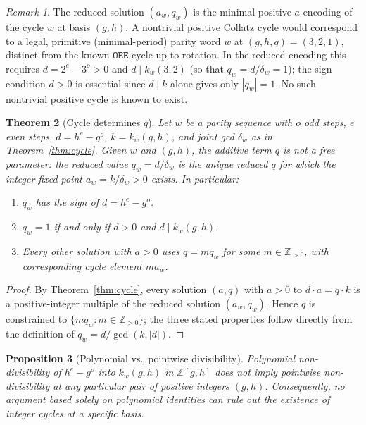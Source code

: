 \documentclass[12pt]{article}
\newtheorem{theorem}{Theorem}[section]
\newtheorem{proposition}[theorem]{Proposition}
\theoremstyle{definition}
\theoremstyle{remark}
\newtheorem{remark}[theorem]{Remark}
\newcommand{\ZZ}{\mathbb{Z}}
\newcommand{\kpoly}{k}
\begin{document}
\begin{remark}
The reduced solution $(a_w, q_w)$ is the minimal positive-$a$ encoding of
the cycle $w$ at basis $(g,h)$.  A nontrivial positive Collatz cycle would
correspond to a legal, primitive (minimal-period) parity word $w$ at
$(g,h,q) = (3,2,1)$, distinct from the known $\mathtt{OEE}$ cycle up to
rotation.  In the reduced encoding this requires $d = 2^e - 3^o > 0$ and
$d \mid \kpoly_w(3,2)$ (so that $q_w = d/\delta_w = 1$); the sign
condition $d > 0$ is essential since $d \mid k$ alone gives only
$|q_w| = 1$.  No such nontrivial positive cycle is known to exist.
\end{remark}

\begin{theorem}[Cycle determines $q$]
\label{thm:q-determined}
Let $w$ be a parity sequence with $o$ odd steps, $e$ even steps,
$d = h^e - g^o$, $k = \kpoly_w(g,h)$, and joint gcd $\delta_w$ as in
Theorem~\ref{thm:cycle}.  Given $w$ and $(g,h)$, the additive term $q$ is
not a free parameter: the reduced value $q_w = d/\delta_w$ is the unique
reduced $q$ for which the integer fixed point $a_w = k/\delta_w > 0$
exists.  In particular:
\begin{enumerate}
  \item $q_w$ has the sign of $d = h^e - g^o$.
  \item $q_w = 1$ if and only if $d > 0$ and $d \mid \kpoly_w(g,h)$.
  \item Every other solution with $a > 0$ uses $q = m q_w$ for some
        $m \in \ZZ_{>0}$, with corresponding cycle element $m a_w$.
\end{enumerate}
\end{theorem}

\begin{proof}
By Theorem~\ref{thm:cycle}, every solution $(a,q)$ with $a > 0$ to
$d \cdot a = q \cdot k$ is a positive-integer multiple of the reduced
solution $(a_w, q_w)$.  Hence $q$ is constrained to $\{m q_w : m \in
\ZZ_{>0}\}$; the three stated properties follow directly from the
definition of $q_w = d/\gcd(k,|d|)$.
\end{proof}

\begin{proposition}[Polynomial vs.\ pointwise divisibility]
\label{prop:pointwise}
Polynomial non-divisibility of $h^e - g^o$ into $\kpoly_w(g,h)$ in
$\ZZ[g,h]$ does \emph{not} imply pointwise non-divisibility at any particular
pair of positive integers $(g,h)$.  Consequently, no argument based solely on polynomial
identities can rule out the existence of integer cycles at a specific basis.
\end{proposition}
\end{document}
